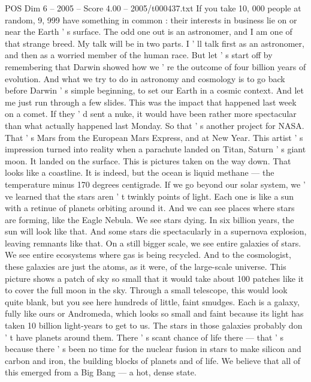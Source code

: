 \begin{textsample}{POS Dim 6 – 2005 – Score 4.00 – 2005/t000437.txt}  \label{ex:f6_pos_004}
If you take 10, 000 people at random, 9, 999 have something in common : their interests in business lie on or near the Earth ' s surface.
The odd one out is an astronomer, and I am one of that strange breed.
My talk will be in two parts.
I ' ll talk first as an astronomer, and then as a worried member of the human race.
But let ' s start off by remembering that Darwin showed how we ' re the outcome of four billion years of evolution.
And what we try to do in astronomy and cosmology is to go back before Darwin ' s simple beginning, to set our Earth in a cosmic context.
And let me just run through a few slides.
This was the impact that happened last week on a comet.
If they ' d sent a nuke, it would have been rather more spectacular than what actually happened last Monday.
So that ' s another project for NASA.
That ' s Mars from the European Mars Express, and at New Year.
This artist ' s impression turned into reality when a parachute landed on Titan, Saturn ' s giant moon.
It landed on the surface.
This is pictures taken on the way down.
That looks like a coastline.
It is indeed, but the ocean is liquid methane — the temperature minus 170 degrees centigrade.
If we go beyond our solar system, we ' ve learned that the stars aren ' t twinkly points of light.
Each one is like a sun with a retinue of planets orbiting around it.
And we can see places where stars are forming, like the Eagle Nebula.
We see stars dying.
In six billion years, the sun will look like that.
And some stars die spectacularly in a supernova explosion, leaving remnants like that.
On a still bigger scale, we see entire galaxies of stars.
We see entire ecosystems where gas is being recycled.
And to the cosmologist, these galaxies are just the atoms, as it were, of the large-scale universe.
This picture shows a patch of sky so small that it would take about 100 patches like it to cover the full moon in the sky.
Through a small telescope, this would look quite blank, but you see here hundreds of little, faint smudges.
Each is a galaxy, fully like ours or Andromeda, which looks so small and faint because its light has taken 10 billion light-years to get to us.
The stars in those galaxies probably don ' t have planets around them.
There ' s scant chance of life there — that ' s because there ' s been no time for the nuclear fusion in stars to make silicon and carbon and iron, the building blocks of planets and of life.
We believe that all of this emerged from a Big Bang — a hot, dense state.

\end{textsample}
